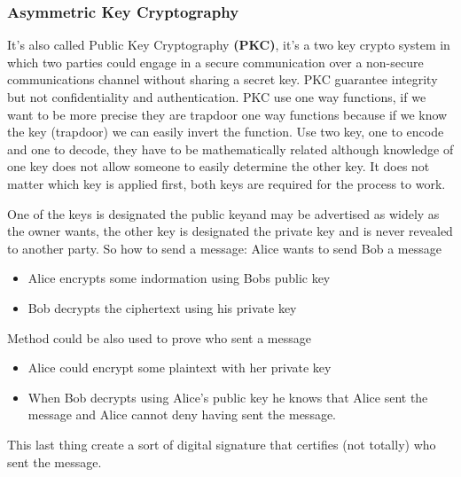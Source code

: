     \subsubsection{Asymmetric Key Cryptography}
    It's also called Public Key Cryptography \textbf{(PKC)}, it's a two key crypto system in which two parties could engage in a secure communication over a non-secure communications channel without sharing a secret key. PKC guarantee integrity but not confidentiality and authentication. PKC use one way functions, if we want to be more precise they are trapdoor one way functions because if we know the key (trapdoor) we can easily invert the function.
    Use two key, one to encode and one to decode, they have to be mathematically related although knowledge of one key does not allow someone to easily determine the other key. It does not matter which key is applied first, both keys are required for the process to work.
    
    One of the keys is designated the public keyand may be advertised as widely as the owner wants, the other key is designated the private key and is never revealed to another party. So how to send a message: Alice wants to send Bob a message
    \begin{itemize}
        \item Alice encrypts some indormation using Bobs public key
        \item Bob decrypts the ciphertext using his private key
    \end{itemize}
    Method could be also used to prove who sent a message
    \begin{itemize}
        \item Alice could encrypt some plaintext with her private key
        \item When Bob decrypts using Alice's public key he knows that Alice sent the message and Alice cannot deny having sent the message.
    \end{itemize}
    This last thing create a sort of digital signature that certifies (not totally) who sent the message.
    
